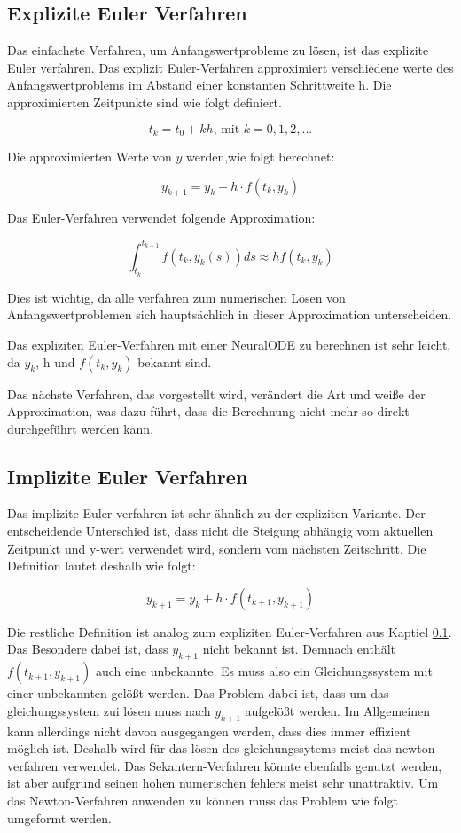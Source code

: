 \subsection{Explizite Euler Verfahren} \label{sec:explizites_euler_verfahren}


Das einfachste Verfahren, um Anfangswertprobleme zu lösen, ist das explizite Euler verfahren.
Das explizit Euler-Verfahren approximiert verschiedene werte des Anfangswertproblems 
im Abstand einer konstanten Schrittweite h.
Die approximierten Zeitpunkte sind wie folgt definiert.

$$
t_k = t_0 + kh \text{, mit } k = 0, 1, 2, ...
$$

Die approximierten Werte von $y$ werden,wie folgt berechnet:

$$
y_{k + 1} = y_{k} + h \cdot f(t_k, y_k)
$$

Das Euler-Verfahren verwendet folgende Approximation:

$$
\int_{t_k}^{t_{k+1}} f(t_k, y_k(s)) ds \approx h f(t_k, y_k)
$$

Dies ist wichtig, da alle verfahren zum numerischen Lösen von Anfangswertproblemen sich hauptsächlich in dieser Approximation unterscheiden.

Das expliziten Euler-Verfahren mit einer NeuralODE  zu berechnen
ist sehr leicht, da $y_k$, h und $f(t_k, y_k)$ bekannt sind.

Das nächste Verfahren, das vorgestellt wird, verändert die Art und weiße der Approximation, was dazu führt, dass die Berechnung nicht mehr so direkt durchgeführt werden kann.

\subsection{Implizite Euler Verfahren}

Das implizite Euler verfahren ist sehr ähnlich zu der expliziten Variante.
Der entscheidende Unterschied ist, dass nicht die Steigung abhängig vom aktuellen 
Zeitpunkt und y-wert verwendet wird, sondern vom nächsten Zeitschritt.
Die Definition lautet deshalb wie folgt:

$$
y_{k + 1} = y_k + h \cdot f(t_{k + 1}, y_{k + 1})
$$

Die restliche Definition ist analog zum expliziten Euler-Verfahren aus Kaptiel \ref{sec:explizites_euler_verfahren}.
Das Besondere dabei ist, dass $y_{k + 1}$ nicht bekannt ist.
Demnach enthält $f(t_{k + 1}, y_{k + 1})$ auch eine unbekannte.
Es muss also ein Gleichungssystem mit einer unbekannten gelößt werden.
Das Problem dabei ist, dass um das gleichungssystem zui lösen muss nach $y_{k + 1}$ aufgelößt werden.
Im Allgemeinen kann allerdings nicht davon ausgegangen werden, dass dies immer effizient möglich ist.
Deshalb wird für das lösen des gleichungssytems meist das newton verfahren verwendet.
Das Sekantern-Verfahren könnte ebenfalls genutzt werden, ist aber aufgrund seinen hohen numerischen 
fehlers meist sehr unattraktiv.
Um das Newton-Verfahren anwenden zu können muss das Problem wie folgt umgeformt werden.

